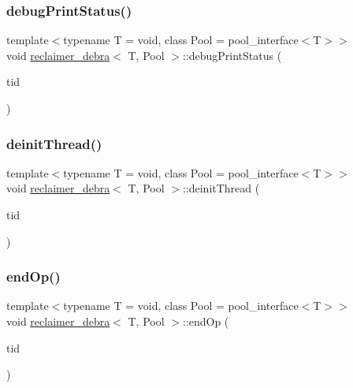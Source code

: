 \subsubsection{\texorpdfstring{debug\+Print\+Status()}{debugPrintStatus()}}
{\footnotesize\ttfamily template$<$typename T  = void, class Pool  = pool\+\_\+interface$<$\+T$>$$>$ \\
void \hyperlink{classreclaimer__debra}{reclaimer\+\_\+debra}$<$ T, Pool $>$\+::debug\+Print\+Status (\begin{DoxyParamCaption}\item[{const int}]{tid }\end{DoxyParamCaption})\hspace{0.3cm}{\ttfamily [inline]}}

\mbox{\label{classreclaimer__debra_aeaa0321be93b27059850fc17d7cc27c8}} 
\subsubsection{\texorpdfstring{deinit\+Thread()}{deinitThread()}}
{\footnotesize\ttfamily template$<$typename T  = void, class Pool  = pool\+\_\+interface$<$\+T$>$$>$ \\
void \hyperlink{classreclaimer__debra}{reclaimer\+\_\+debra}$<$ T, Pool $>$\+::deinit\+Thread (\begin{DoxyParamCaption}\item[{const int}]{tid }\end{DoxyParamCaption})\hspace{0.3cm}{\ttfamily [inline]}}

\mbox{\label{classreclaimer__debra_a668ee2af696ff2a3e84944ca9284014f}} 
\subsubsection{\texorpdfstring{end\+Op()}{endOp()}}
{\footnotesize\ttfamily template$<$typename T  = void, class Pool  = pool\+\_\+interface$<$\+T$>$$>$ \\
void \hyperlink{classreclaimer__debra}{reclaimer\+\_\+debra}$<$ T, Pool $>$\+::end\+Op (\begin{DoxyParamCaption}\item[{const int}]{tid }\end{DoxyParamCaption})\hspace{0.3cm}{\ttfamily [inline]}}

